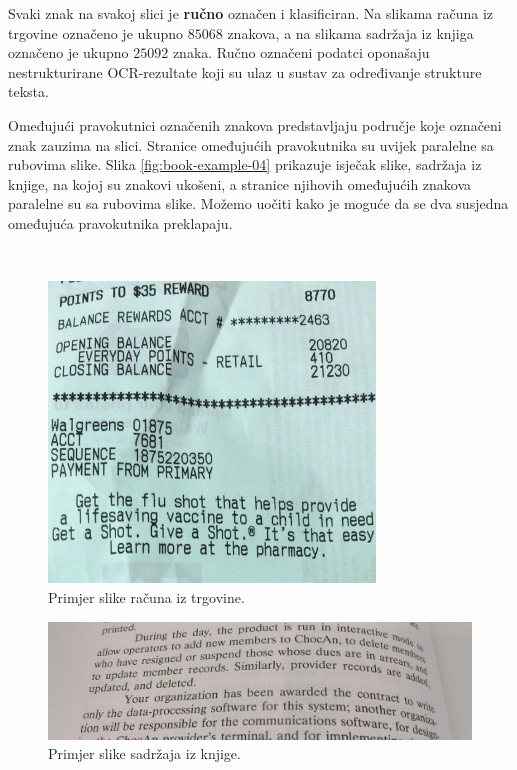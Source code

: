 \documentclass[times, utf8, zavrsni]{fer}
\begin{document}
Svaki znak na svakoj slici je \textbf{ručno} označen i klasificiran. Na slikama
računa iz trgovine označeno je ukupno $85068$ znakova, a na slikama sadržaja iz
knjiga označeno je ukupno $25092$ znaka. Ručno označeni podatci oponašaju
nestrukturirane OCR-rezultate koji su ulaz u sustav za određivanje strukture
teksta.

Omeđujući pravokutnici označenih znakova predstavljaju područje koje označeni
znak zauzima na slici. Stranice omeđujućih pravokutnika su uvijek paralelne sa
rubovima slike. Slika \ref{fig:book-example-04} prikazuje isječak slike,
sadržaja iz knjige, na kojoj su znakovi ukošeni, a stranice njihovih omeđujućih
znakova paralelne su sa rubovima slike. Možemo uočiti kako je moguće da se dva
susjedna omeđujuća pravokutnika preklapaju.

\

\begin{figure}[!htb]
    \centering
    \captionsetup{justification=centering,margin=2cm}
    \includegraphics[height=8cm]{images/receipt-example-04.jpg}
    \caption{Primjer slike računa iz trgovine.}
    \label{fig:receipt-example-04}
\end{figure}

\pagebreak

\begin{figure}[htb]
    \centering
    \captionsetup{justification=centering,margin=2cm}
    \includegraphics[width=\textwidth]{images/book-example-03.jpg}
    \caption{Primjer slike sadržaja iz knjige.}
    \label{fig:book-example-03}
\end{figure}
\end{document}
